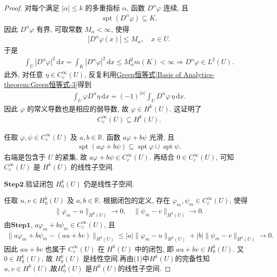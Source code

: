 \documentclass[../../main.tex]{subfiles}
\begin{document}
\begin{proof}
对每个满足 $|\alpha|\leqslant k$ 的多重指标 $\alpha$, 函数 $D^\alpha\varphi$ 连续, 且
\begin{align*}
\operatorname{spt}(D^\alpha\varphi)\subseteq K.
\end{align*}
因此 $D^\alpha\varphi$ 有界, 可取常数 $M_\alpha<\infty$, 使得
\begin{align*}
|D^\alpha\varphi(x)|\leqslant M_\alpha,
\quad x\in U.
\end{align*}
于是
\begin{align*}
\int_U |D^\alpha\varphi|^2\,\mathrm{d}x
=
\int_K |D^\alpha\varphi|^2\,\mathrm{d}x
\leqslant M_\alpha^2m(K)
<\infty\Longrightarrow D^\alpha \varphi \in L^2(U).
\end{align*}
此外, 对任意 $\eta\in C_c^\infty(U)$, 反复利用\hyperref[Basis of Analytics-theorem:Green恒等式]{Green恒等式\ref{Basis of Analytics-theorem:Green恒等式-3}}得到
\begin{align*}
\int_U \varphi D^\alpha\eta\,\mathrm{d}x
=
(-1)^{|\alpha|}
\int_U D^\alpha\varphi\,\eta\,\mathrm{d}x.
\end{align*}
因此 $\varphi$ 的常义导数也是相应的弱导数, 故 $\varphi\in H^k(U)$. 这证明了
\begin{align*}
C_c^\infty(U)\subseteq H^k(U).
\end{align*}

任取 $\varphi,\psi\in C_c^\infty(U)$ 及 $a,b\in\mathbb{R}$. 函数 $a\varphi+b\psi$ 光滑, 且
\begin{align*}
\operatorname{spt}(a\varphi+b\psi)
\subseteq
\operatorname{spt}\varphi\cup\operatorname{spt}\psi.
\end{align*}
右端是包含于 $U$ 的紧集, 故 $a\varphi+b\psi\in C_c^\infty(U)$. 再结合 $0\in C_c^\infty(U)$, 可知 $C_c^\infty(U)$ 是 $H^k(U)$ 的线性子空间.

\noindent$\mathbf{Step}\mathbf{2}.${\heiti 验证闭包 $H_0^k(U)$ 仍是线性子空间.}

任取 $u,v\in H_0^k(U)$ 及 $a,b\in\mathbb{R}$. 根据闭包的定义, 存在 $\varphi_m,\psi_m\in C_c^\infty(U)$, 使得
\begin{align*}
\|\varphi_m-u\|_{H^k(U)}\longrightarrow 0,
\quad
\|\psi_m-v\|_{H^k(U)}\longrightarrow 0.
\end{align*}
由$\mathbf{Step}\mathbf{1}$, $a\varphi_m+b\psi_m\in C_c^\infty(U)$, 且
\begin{align*}
\|a\varphi_m+b\psi_m-(au+bv)\|_{H^k(U)}
\leqslant
|a|\|\varphi_m-u\|_{H^k(U)}
+
|b|\|\psi_m-v\|_{H^k(U)}
\longrightarrow 0.
\end{align*}
因此 $au+bv$ 也属于 $C_c^\infty(U)$ 在 $H^k(U)$ 中的闭包, 即 $au+bv\in H_0^k(U)$. 又 $0\in H_0^k(U)$, 故 $H_0^k(U)$ 是线性空间.再由(1)中$H^k(U)$的完备性知$u,v\in H^k(U)$,故$H_0^k(U)$ 是$H^k(U)$的线性子空间.


\end{proof}
\end{document}
